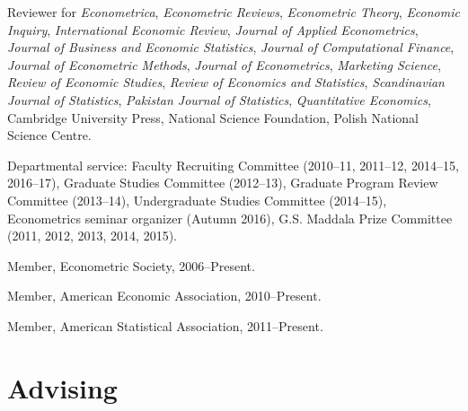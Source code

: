 \documentclass[10pt,letterpaper]{article}
\renewenvironment{itemize}{
  \begin{list}{}{
    \setlength{\leftmargin}{1.5em}
    \setlength{\itemsep}{0.25em}
    \setlength{\parskip}{0pt}
    \setlength{\parsep}{0.25em}
  }
}{
  \end{list}
}
\begin{document}
\begin{itemize}
\item Reviewer for
  \textit{Econometrica}, %
  \textit{Econometric Reviews}, %
  \textit{Econometric Theory}, %
  \textit{Economic Inquiry}, %
  \textit{International Economic Review}, %
  \textit{Journal of Applied Econometrics}, %
  \textit{Journal of Business and Economic Statistics}, %
  \textit{Journal of Computational Finance}, %
  \textit{Journal of Econometric Methods}, %
  \textit{Journal of Econometrics}, %
  \textit{Marketing Science}, %
  \textit{Review of Economic Studies}, %
  \textit{Review of Economics and Statistics}, %
  \textit{Scandinavian Journal of Statistics}, %
  \textit{Pakistan Journal of Statistics}, %
  \textit{Quantitative Economics}, %
  Cambridge University Press, %
  National Science Foundation, %
  Polish National Science Centre. %
\item Departmental service:
  Faculty Recruiting Committee (2010--11, 2011--12, 2014--15, 2016--17),
  Graduate Studies Committee (2012--13),
  Graduate Program Review Committee (2013--14),
  Undergraduate Studies Committee (2014--15),
  Econometrics seminar organizer (Autumn 2016),
  G.S. Maddala Prize Committee (2011, 2012, 2013, 2014, 2015).
\item Member, Econometric Society, 2006--Present.
\item Member, American Economic Association, 2010--Present.
\item Member, American Statistical Association, 2011--Present.
\end{itemize}

\section*{Advising}
\end{document}
